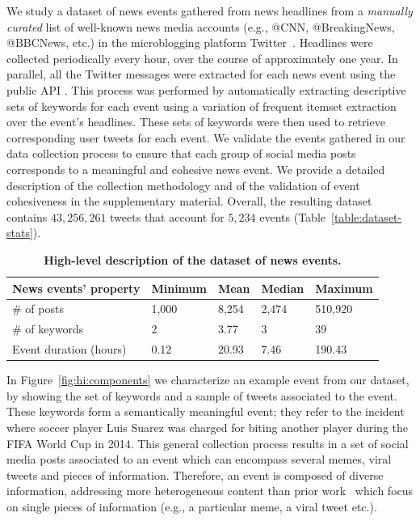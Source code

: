 We study a dataset of news events gathered from news headlines from a
\emph{manually curated} list of well-known news media accounts (e.g., @CNN,
@BreakingNews, @BBCNews, etc.) in the microblogging platform
Twitter~\cite{twitter}. 
%
Headlines were collected periodically every hour, over the course of
approximately one year. 
%
In parallel, all the Twitter messages were extracted for each news event using
the public API \cite{twitterapi}.
%
This process was performed by automatically extracting descriptive sets of
keywords for each event using a variation of frequent itemset
extraction~\cite{Tan_Steinbach_Kumar} over the event's headlines. 
%
These sets of keywords were then used to retrieve corresponding user tweets for
each event. 
%
We validate the events gathered in our data collection process to ensure that
each group of social media posts corresponds to a meaningful and cohesive news
event. 
%
We provide a detailed description of the collection methodology and of
the validation of event cohesiveness in the supplementary material. 
%
Overall, the resulting dataset contains $43,256,261$ tweets that account for
$5,234$ events (Table~\ref{table:dataset-stats}).


\begin{table}
  \centering
  \begin{tabularx}{\textwidth}{@{}p{6cm}llll@{}}
    \toprule
    \textbf{News events' property} & \textbf{Minimum} & \textbf{Mean} & \textbf{Median} & \textbf{Maximum} \\ \midrule
    \# of posts & 1,000 & 8,254 & 2,474 & 510,920 \\
    \# of keywords & 2 & 3.77 & 3 & 39 \\
    Event duration (hours) & 0.12 & 20.93 & 7.46 & 190.43 \\ \bottomrule
  \end{tabularx}
  \caption{\bf High-level description of the dataset of news events.} 
  \label{table:hi:dataset-stats}
\end{table}



In Figure~\ref{fig:hi:components} we characterize an example event from our
dataset, by showing the set of keywords and a sample of tweets associated to the
event. 
%
These keywords form a semantically meaningful event; they refer to the incident
where soccer player Luis Suarez was charged for biting another player during the
FIFA World Cup in 2014. 
%
This general collection process results in a set of social media posts
associated to an event which can encompass several memes, viral tweets and
pieces of information. 
%
Therefore, an event is composed of diverse information, addressing more
heterogeneous content than prior
work~\cite{Castillo:2014,Szabo:2010,Lerman:2010,Tatar:2011,Pinto:2013,Ahmed:2013,suh2010want}
which focus on single pieces of information (e.g., a particular meme, a viral
tweet etc.).


